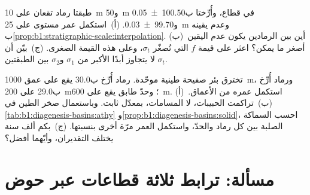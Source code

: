 \begin{exercise}[$\star\star\star$]\label{exo:b1:stratigraphic-scale:11}
طبقتا رماد تقعان على \qty{10}{m} و\qty{50}{m} في قطاع، وأُرِّختا ب\qty[uncertainty-mode=separate]{100.50(5)}{\Ma} و\qty[uncertainty-mode=separate]{99.70(3)}{\Ma}. (أ)~استكمل عمر مستوى على \qty{25}{m} وعدم يقينه ب\cref{prop:b1:stratigraphic-scale:interpolation}. (ب)~أين بين الرمادين يكون عدم اليقين أصغر ما يمكن؟ اعثر على قيمة $f$ التي تُصغّر $\sigma_t$، وعلى هذه القيمة الصغرى. (ج)~بيّن أن $\sigma_t$ لا يتجاوز أبدًا الأكبر من $\sigma_1$ و$\sigma_2$ بين الطبقتين.
\end{exercise}

\begin{exercise}[$\star\star\star$]\label{exo:b1:stratigraphic-scale:12}
تخترق بئر صفيحة طينية موحّدة. رماد أُرِّخ ب\qty{30.0}{\Ma} يقع على عمق \qty{1000}{m}، ورماد أُرِّخ ب\qty{29.0}{\Ma} على \qty{200}{m}؛ وحدّ طابق يقع على \qty{600}{m}. (أ)~استكمل عمره من الأعماق. (ب)~تراكمت الحبيبات، لا المسامات، بمعدّل ثابت. وباستعمال صخر الطين في \cref{tab:b1:diagenesis-basins:athy} و\cref{prop:b1:diagenesis-basins:solid}، احسب السماكة الصلبة بين كل رماد والحدّ، واستكمل العمر مرّة أخرى بنسبتها. (ج)~بكم ألف سنة يختلف التقديران، وأيّهما أفضل؟
\end{exercise}

\section{مسألة: ترابط ثلاثة قطاعات عبر حوض}

